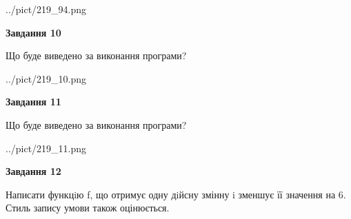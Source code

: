 \documentclass[12pt, ukrainian]{article}
\begin{document}
{\begin {large}
\begin{center}
	{../pict/219_94.png}
\end{center}
\newpage

{\begin {center}\textbf{Завдання 10}\end {center}}

Що буде виведено за виконання програми?\par
\begin{center}
	{../pict/219_10.png}
\end{center}
\newpage

{\begin {center}\textbf{Завдання 11}\end {center}}

Що буде виведено за виконання програми?\par
\begin{center}
	{../pict/219_11.png}
\end{center}
\newpage

{\begin {center}\textbf{Завдання 12}\end {center}}


Написати функцiю f, що отримує одну дiйсну змінну i зменшує її значення на 6. Стиль запису умови також оцінюється.\par
\newpage

\end {large}}
\end{document}
